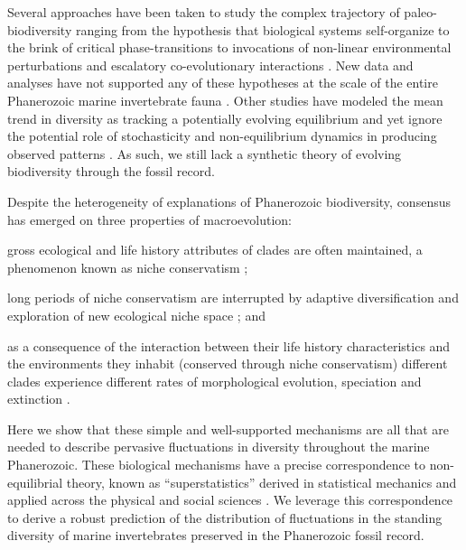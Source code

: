 \documentclass[12pt]{article}
\let\citep=\cite
\begin{document}
Several approaches have been taken to study the complex trajectory of
paleo-biodiversity ranging from the hypothesis that biological systems
self-organize to the brink of critical phase-transitions
\citep{bak1993, sole1997} to invocations of non-linear environmental
perturbations \citep{newman1995} and escalatory co-evolutionary
interactions \citep{vermeij1987}. New data and analyses have not
supported any of these hypotheses at the scale of the entire
Phanerozoic marine invertebrate fauna \citep{kirchner1998, madin2006,
  alroy08}. Other studies have modeled the mean trend in diversity as
tracking a potentially evolving equilibrium \citep{sepkoski1984,
  alroy08, alroy2010, rabosky2009ecolLett} and yet ignore the
potential role of stochasticity and non-equilibrium dynamics in
producing observed patterns \citep{erwin2012, liow2007,
  quental2013}. As such, we still lack a synthetic theory of evolving
biodiversity through the fossil record.

Despite the heterogeneity of explanations of Phanerozoic
biodiversity, consensus has emerged on three properties of
macroevolution:
\begin{inparaenum}
\item gross ecological and life history attributes of clades
  are often maintained, a phenomenon known as niche conservatism
  \citep{roy2009range, hopkins2014};
\item long periods of niche conservatism are interrupted by adaptive
  diversification and exploration of new ecological niche space
  \citep{eldredgeGould1972, newman1985adaptive, hopkins2014}; and
\item as a consequence of the interaction between their life history
  characteristics and the environments they inhabit
  \citep{vrba1983} (conserved through niche conservatism) different
  clades experience different rates of morphological evolution,
  speciation and extinction \citep{simpson1953, sepkoski1984,
    holman1989, gilinsky1994}.
\end{inparaenum}

Here we show that these simple and well-supported mechanisms are all
that are needed to describe pervasive fluctuations in diversity
throughout the marine Phanerozoic.  These biological mechanisms have a
precise correspondence to non-equilibrial theory, known as
``superstatistics'' derived in statistical mechanics \citep{beck2003}
and applied across the physical and social sciences \citep{beck2004,
  fuentes2009}. We leverage this correspondence to derive a robust
prediction of the distribution of fluctuations in the standing
diversity of marine invertebrates preserved in the Phanerozoic fossil
record.
\end{document}
